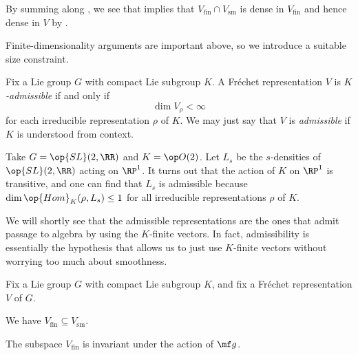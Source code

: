 \documentclass[../notes.tex]{subfiles}
\begin{document}
\begin{remark}
	By summing along , we see that  implies that $V_{\mathrm{fin}}\cap V_{\mathrm{sm}}$ is dense in $V_{\mathrm{fin}}$ and hence dense in $V$ by .
\end{remark}
Finite-dimensionality arguments are important above, so we introduce a suitable size constraint.
\begin{definition}[admissible]
	Fix a Lie group $G$ with compact Lie subgroup $K$. A Fr\'echet representation $V$ is \textit{$K$-admissible} if and only if
	\[\dim V_\rho<\infty\]
	for each irreducible representation $\rho$ of $K$. We may just say that $V$ is \textit{admissible} if $K$ is understood from context.
\end{definition}
\begin{example}
	Take $G=\op{SL}(2,\RR)$ and $K=\op O(2)$. Let $L_s$ be the $s$-densities of $\op{SL}(2,\RR)$ acting on $\RP^1$. It turns out that the action of $K$ on $\RP^1$ is transitive, and one can find that $L_s$ is admissible because $\dim\op{Hom}_K(\rho,L_s)\le1$ for all irreducible representations $\rho$ of $K$.
\end{example}
We will shortly see that the admissible representations are the ones that admit passage to algebra by using the $K$-finite vectors. In fact, admissibility is essentially the hypothesis that allows us to just use $K$-finite vectors without worrying too much about smoothness.
\begin{lemma}
	Fix a Lie group $G$ with compact Lie subgroup $K$, and fix a Fr\'echet representation $V$ of $G$.
	\begin{listalph}
		\item We have $V_{\mathrm{fin}}\subseteq V_{\mathrm{sm}}$.
		\item The subspace $V_{\mathrm{fin}}$ is invariant under the action of $\mf g$.
	\end{listalph}
\end{lemma}
\end{document}
